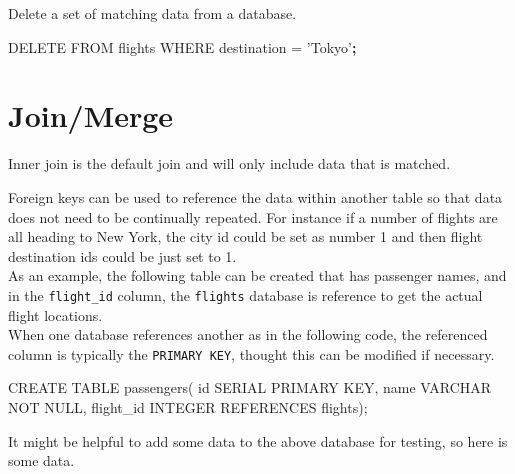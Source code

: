 \documentclass[]{book}
\newenvironment{Shaded}{\begin{snugshade}}{\end{snugshade}}
\newcommand{\ExtensionTok}[1]{#1}
\newcommand{\FunctionTok}[1]{\textcolor[rgb]{0.00,0.00,0.00}{#1}}
\newcommand{\KeywordTok}[1]{\textcolor[rgb]{0.13,0.29,0.53}{\textbf{#1}}}
\newcommand{\NormalTok}[1]{#1}
\newcommand{\StringTok}[1]{\textcolor[rgb]{0.31,0.60,0.02}{#1}}
\begin{document}
Delete a set of matching data from a database.

\begin{Shaded}
\begin{Highlighting}[]
\ExtensionTok{DELETE}\NormalTok{ FROM flights}
\ExtensionTok{WHERE}\NormalTok{ destination = }\StringTok{'Tokyo'}\KeywordTok{;}
\end{Highlighting}
\end{Shaded}

\hypertarget{joinmerge}{%
\section{Join/Merge}\label{joinmerge}}

Inner join is the default join and will only include data that is matched.

Foreign keys can be used to reference the data within another table so that data does not need to be continually repeated. For instance if a number of flights are all heading to New York, the city id could be set as number 1 and then flight destination ids could be just set to 1.\\
As an example, the following table can be created that has passenger names, and in the \texttt{flight\_id} column, the \texttt{flights} database is reference to get the actual flight locations.\\
When one database references another as in the following code, the referenced column is typically the \texttt{PRIMARY\ KEY}, thought this can be modified if necessary.

\begin{Shaded}
\begin{Highlighting}[]
\ExtensionTok{CREATE}\NormalTok{ TABLE passengers(}
    \FunctionTok{id}\NormalTok{ SERIAL PRIMARY KEY,}
    \ExtensionTok{name}\NormalTok{ VARCHAR NOT NULL,}
    \ExtensionTok{flight_id}\NormalTok{ INTEGER REFERENCES flights);}
\end{Highlighting}
\end{Shaded}

It might be helpful to add some data to the above database for testing, so here is some data.
\end{document}
